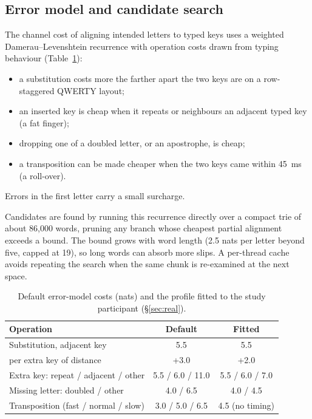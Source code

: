 \documentclass[11pt,a4paper]{article}
\begin{document}
\subsection{Error model and candidate search}
The channel cost of aligning intended letters to typed keys uses a weighted Damerau--Levenshtein recurrence with operation costs drawn from typing behaviour (Table~\ref{tab:channel}):
\begin{itemize}
\item a substitution costs more the farther apart the two keys are on a row-staggered QWERTY layout;
\item an inserted key is cheap when it repeats or neighbours an adjacent typed key (a fat finger);
\item dropping one of a doubled letter, or an apostrophe, is cheap;
\item a transposition can be made cheaper when the two keys came within 45~ms (a roll-over).
\end{itemize}
Errors in the first letter carry a small surcharge.

Candidates are found by running this recurrence directly over a compact trie of about 86,000 words, pruning any branch whose cheapest partial alignment exceeds a bound. The bound grows with word length (2.5 nats per letter beyond five, capped at 19), so long words can absorb more slips. A per-thread cache avoids repeating the search when the same chunk is re-examined at the next space.

\begin{table}[t]
\centering\small
\caption{Default error-model costs (nats) and the profile fitted to the study participant (\S\ref{sec:real}).}
\label{tab:channel}
\begin{tabular}{lcc}
\toprule
Operation & Default & Fitted \\
\midrule
Substitution, adjacent key & 5.5 & 5.5 \\
\quad per extra key of distance & +3.0 & +2.0 \\
Extra key: repeat / adjacent / other & 5.5 / 6.0 / 11.0 & 5.5 / 6.0 / 7.0 \\
Missing letter: doubled / other & 4.0 / 6.5 & 4.0 / 4.5 \\
Transposition (fast / normal / slow) & 3.0 / 5.0 / 6.5 & 4.5 (no timing) \\
\bottomrule
\end{tabular}
\end{table}
\end{document}
